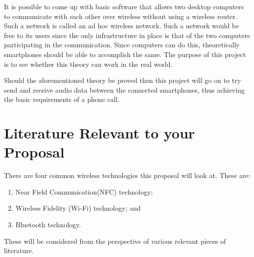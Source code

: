 \documentclass[12pt,svgnames,smaller]{article} %
\begin{document}
It is possible to come up with basic software that allows two desktop computers to communicate with each other over wireless without using a wireless router. Such a network is called an ad hoc wireless network. Such a network would be free to its users since the only infrastructure in place is that of the two computers participating in the communication. Since computers can do this, theoretically smartphones should be able to accomplish the same. The purpose of this project is to see whether this theory can work in the real world. 

Should the aforementioned theory be proved then this project will go on to try send and receive audio data between the connected smartphones, thus achieving the basic requirements of a phone call.


\clearpage


\section{ \textbf{ Literature Relevant to your Proposal } } 

There are four common wireless technologies this proposal will look at. These are:

\begin{enumerate}
	\item Near Field Communication(NFC) technology;
	\item Wireless Fidelity (Wi-Fi) technology; and
	\item Bluetooth technology. 
\end{enumerate}

These will be considered from the perspective of various relevant pieces of literature.
\end{document}
